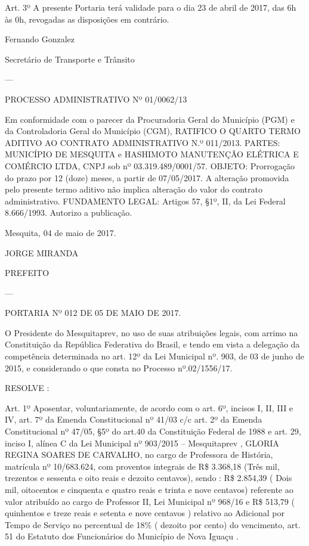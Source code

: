\documentclass{doliberto}
\begin{document}
Art. 3º A presente Portaria terá validade para o dia 23 de 
abril de 2017, das 6h às 0h, revogadas as disposições em 
contrário. 

Fernando Gonzalez 

Secretário de Transporte e Trânsito 

---

PROCESSO ADMINISTRATIVO Nº 01/0062/13 

Em  conformidade  com  o  parecer  da  Procuradoria  Geral  do 
Município (PGM) e da Controladoria Geral do Município (CGM), 
RATIFICO  O  QUARTO  TERMO  ADITIVO  AO  CONTRATO 
ADMINISTRATIVO  N.º  011/2013.  PARTES:  MUNICÍPIO  DE 
MESQUITA  e  HASHIMOTO  MANUTENÇÃO  ELÉTRICA  E 
COMÉRCIO  LTDA,  CNPJ  sob  nº  03.319.489/0001/57.  OBJETO: 
Prorrogação  do  prazo  por  12  (doze)  meses,  a  partir  de 
07/05/2017.  A  alteração  promovida  pelo  presente  termo 
aditivo  não 
implica  alteração  do  valor  do  contrato 
administrativo. FUNDAMENTO LEGAL: Artigos 57, §1º, II, da Lei 
Federal 8.666/1993. Autorizo a publicação. 
 

Mesquita, 04 de maio de 2017. 

JORGE MIRANDA 

PREFEITO 

---

PORTARIA Nº 012 DE 05 DE MAIO DE 2017.  

O  Presidente  do  Mesquitaprev,  no  uso  de  suas  atribuições 
legais, com arrimo na Constituição da República Federativa 
do  Brasil,  e  tendo  em  vista  a  delegação  da  competência 
determinada no art. 12º da Lei Municipal nº. 903, de 03 de 
junho  de  2015,  e  considerando  o  que  consta  no  Processo 
nº.02/1556/17. 

                                                                                                                                      
RESOLVE : 

Art. 1º Aposentar, voluntariamente, de acordo com o art. 6º, 
incisos  I,  II,  III  e  IV,  art.  7º  da  Emenda  Constitucional  nº 
41/03 c/c  art. 2º da Emenda Constitucional nº 47/05, §5º 
do art.40 da Constituição Federal de 1988 e art. 29, inciso I, 
alínea  C  da  Lei  Municipal  nº  903/2015  –  Mesquitaprev  , 
GLORIA  REGINA  SOARES  DE  CARVALHO,    no  cargo  de 
Professora  de  História,  matrícula  nº  10/683.624,  com 
proventos  integrais  de  R\$  3.368,18    (Três  mil,  trezentos  e 
sessenta e oito reais e dezoito centavos), sendo : R\$ 2.854,39 
(  Dois  mil,  oitocentos  e  cinquenta  e  quatro  reais  e  trinta  e 
nove  centavos)  referente  ao  valor  atribuído  ao  cargo  de 
Professor    II,  Lei  Municipal  nº  968/16  e    R\$  513,79    ( 
quinhentos e treze reais e setenta e nove centavos ) relativo 
ao Adicional por Tempo de Serviço no percentual de 18\% ( 
dezoito  por  cento)  do  vencimento,  art.  51  do  Estatuto  dos 
Funcionários do Município de Nova Iguaçu .  
\end{document}
